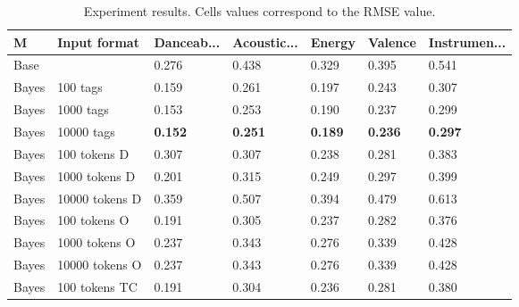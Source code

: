\documentclass[sn-mathphys]{sn-jnl}%
\theoremstyle{thmstyleone}%
\theoremstyle{thmstyletwo}%
\theoremstyle{thmstylethree}%
\begin{document}
\begin{table}[h!]
      \begin{center}
      \begin{minipage}{\textwidth}
      \caption{Experiment results. Cells values correspond to the RMSE value.}\label{table:experiment_results}%
      \begin{tabular}{@{}lllllll@{}}
      \toprule
      M         & Input format                        & Danceab...       & Acoustic...    & Energy          & Valence         & Instrumen... \\
      \midrule
      Base      &                                     & 0.276            & 0.438           & 0.329          & 0.395           & 0.541          \\
      \midrule
      Bayes     & 100 tags\footnotemark[1]            & 0.159            & 0.261           & 0.197          & 0.243           & 0.307          \\
      Bayes     & 1000 tags                           & 0.153            & 0.253           & 0.190          & 0.237           & 0.299          \\
      Bayes     & 10000 tags                          &\textbf{0.152}    &\textbf{0.251}   &\textbf{0.189}  &\textbf{0.236}   &\textbf{0.297}  \\
      Bayes     & 100 tokens D\footnotemark[2]        & 0.307            & 0.307           & 0.238          & 0.281           & 0.383          \\
      Bayes     & 1000 tokens D                       & 0.201            & 0.315           & 0.249          & 0.297           & 0.399          \\
      Bayes     & 10000 tokens D                      & 0.359            & 0.507           & 0.394          & 0.479           & 0.613          \\
      Bayes     & 100 tokens O\footnotemark[3]        & 0.191            & 0.305           & 0.237          & 0.282           & 0.376          \\
      Bayes     & 1000 tokens O                       & 0.237            & 0.343           & 0.276          & 0.339           & 0.428          \\
      Bayes     & 10000 tokens O                      & 0.237            & 0.343           & 0.276          & 0.339           & 0.428          \\
      Bayes     & 100 tokens TC\footnotemark[4]       & 0.191            & 0.304           & 0.236          & 0.281           & 0.380          \\

\end{tabular}
\end{minipage}
\end{center}
\end{table}
\end{document}
